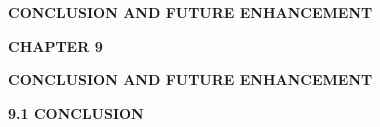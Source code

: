 \vspace*{\fill}
\begin{center}
  {\fontsize{18pt}{24pt}\selectfont\bfseries CONCLUSION AND FUTURE ENHANCEMENT\par}
\end{center}
\vspace*{\fill}
\newpage

\begin{center}
  {\fontsize{16pt}{20pt}\selectfont\bfseries CHAPTER 9\par}
  \vspace{0.3cm}
  {\fontsize{16pt}{20pt}\selectfont\bfseries CONCLUSION AND FUTURE ENHANCEMENT\par}
\end{center}
\vspace{0.4cm}

{\fontsize{14pt}{18pt}\selectfont\bfseries 9.1 CONCLUSION\par}
\vspace{0.3cm}

